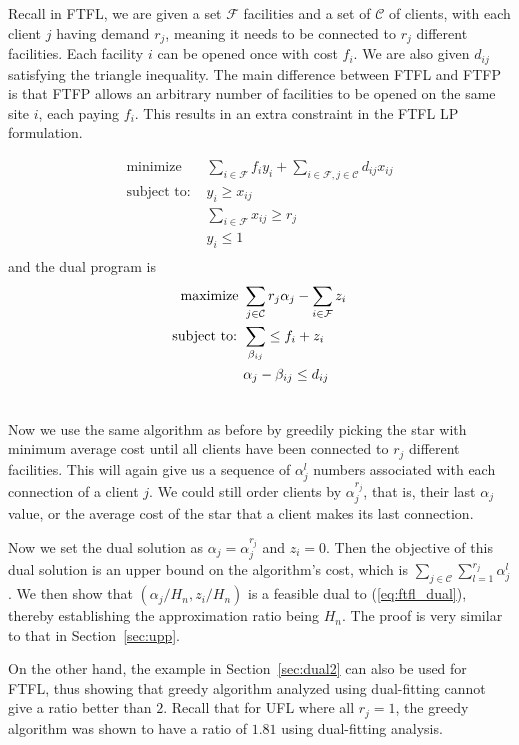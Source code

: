 \documentclass{article}
\begin{document}
Recall in FTFL, we are given a set $\mathcal F$ facilities and a set of
$\mathcal C$ of clients, with each client $j$ having demand $r_j$,
meaning it needs to be connected to $r_j$ different facilities. Each
facility $i$ can be opened once with cost $f_i$. We are also given
$d_{ij}$ satisfying the triangle inequality. The main difference
between FTFL and FTFP is that FTFP allows an arbitrary number of
facilities to be opened on the same site $i$, each paying $f_i$. This
results in an extra constraint in the FTFL LP formulation.

\begin{align*}
  \text{minimize }& \sum_{i\in\mathcal{F}} f_i y_i +
  \sum_{i\in\mathcal{F}, j\in\mathcal{C}} d_{ij} x_{ij}\\
  \text{subject to: }& y_i \geq x_{ij}\\
  &\sum_{i\in\mathcal{F}} x_{ij} \geq r_j\\
  &y_i \leq 1\\
\end{align*}
and the dual program is
\begin{align}
  \label{eq:ftfl_dual}
  \text{maximize }& \sum_{j\in\mathcal{C}} r_j \alpha_j -
  \sum_{i\in\mathcal{F}} z_i\\ \notag
  \text{subject to: }& \sum_{\beta_{ij}} \leq f_i + z_i\\ \notag
  & \alpha_j - \beta_{ij} \leq d_{ij}\\ \notag
\end{align}

Now we use the same algorithm as before by greedily picking the star
with minimum average cost until all clients have been connected to
$r_j$ different facilities. This will again give us a sequence of
$\alpha_j^l$ numbers associated with each connection of a client
$j$. We could still order clients by $\alpha_j^{r_j}$, that is, their
last $\alpha_j$ value, or the average cost of the star that a client
makes its last connection.

Now we set the dual solution as $\alpha_j = {\alpha_j^{r_j}}$ and $z_i
= 0$. Then the objective of this dual solution is an upper bound on
the algorithm's cost, which is $\sum_{j\in\mathcal{C}}\sum_{l=1}^{r_j}
\alpha_j^l$. We then show that $(\alpha_j/H_n, z_i/H_n)$ is a feasible
dual to (\ref{eq:ftfl_dual}), thereby establishing the approximation
ratio being $H_n$. The proof is very similar to that in
Section~\ref{sec:upp}.

On the other hand, the example in Section~\ref{sec:dual2} can also be
used for FTFL, thus showing that greedy algorithm analyzed using
dual-fitting cannot give a ratio better than $2$. Recall that for UFL
where all $r_j=1$, the greedy algorithm was shown to have a ratio of
$1.81$ using dual-fitting analysis.
\end{document}
